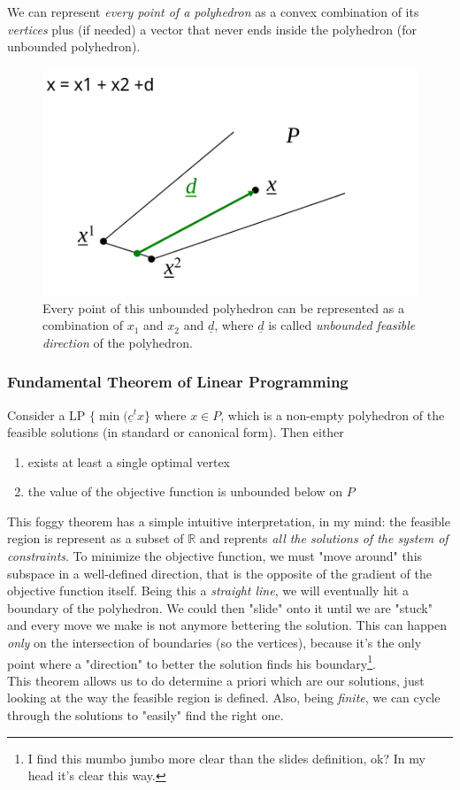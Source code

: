\documentclass{article}
\begin{document}
				We can represent \textit{every point of a polyhedron} as a convex combination of its \textit{vertices} plus (if needed) a vector that never ends inside the polyhedron (for unbounded polyhedron).
				\begin{figure}[H]
					\centering
					\includegraphics{./images/Polyhedron2.png}
					\caption{Every point of this unbounded polyhedron can be represented as a combination of $x_1$ and $x_2$ and $\underline{d}$, where $\underline{d}$ is called \textit{unbounded feasible direction} of the polyhedron.} 
				\end{figure}

				\subsubsection{Fundamental Theorem of Linear Programming}
					Consider a LP $\{\min(\underline{c}^tx\}$ where $x \in P$, which is a non-empty polyhedron of the feasible solutions (in standard or canonical form). Then either
					\begin{enumerate}
						\item exists at least a single optimal vertex
						\item the value of the objective function is unbounded below on $P$
					\end{enumerate}
					This foggy theorem has a simple intuitive interpretation, in my mind: the feasible region is represent as a subset of $\mathbb{R}$ and reprents \textit{all the solutions of the system of constraints}. To minimize the objective function, we must "move around" this subspace in a well-defined direction, that is the opposite of the gradient of the objective function itself. Being this a \textit{straight line}, we will eventually hit a boundary of the polyhedron. We could then "slide" onto it until we are "stuck" and every move we make is not anymore bettering the solution. This can happen \textit{only} on the intersection of boundaries (so the vertices), because it's the only point where a "direction" to better the solution finds his boundary\footnote{I find this mumbo jumbo more clear than the slides definition, ok? In my head it's clear this way.}.\\
					This theorem allows us to do determine a priori which are our solutions, just looking at the way the feasible region is defined. Also, being \textit{finite}, we can cycle through the solutions to "easily" find the right one.
\end{document}
